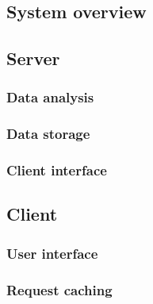 
\subsection{System overview}


\subsection{Server}

\subsubsection{Data analysis}

\subsubsection{Data storage}

\subsubsection{Client interface}

\subsection{Client}

\subsubsection{User interface}

\subsubsection{Request caching}


